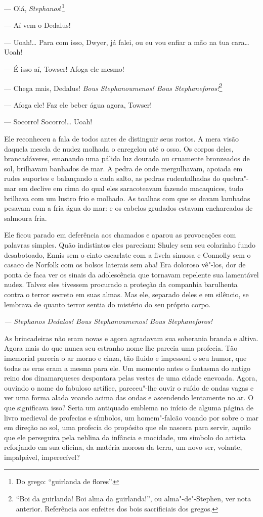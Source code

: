  --- Olá, \textit{Stephanos}!\footnote{ Do grego: ``guirlanda de flores''.}

 --- Aí vem o Dedalus!

 --- Uoah!\ldots{} Para com isso, Dwyer, já falei, ou eu vou enfiar a mão na
tua cara\ldots{} Uoah!

 --- É isso aí, Towser! Afoga ele mesmo!

 --- Chega mais, Dedalus! \textit{Bous Stephanoumenos! Bous
Stephaneforos!}\footnote{ ``Boi da guirlanda! Boi alma da guirlanda!'', ou
alma"-de"-Stephen, ver nota anterior. Referência aos enfeites dos bois
sacrificiais dos gregos.}

 --- Afoga ele! Faz ele beber água agora, Towser!

 --- Socorro! Socorro!\ldots{} Uoah!

Ele reconheceu a fala de todos antes de distinguir seus rostos. A mera
visão daquela mescla de nudez molhada o enregelou até o osso. Os corpos
deles, brancadáveres, emanando uma pálida luz dourada ou cruamente 
bronzeados de sol, brilhavam banhados de mar. A pedra de onde
mergulhavam, apoiada em rudes suportes e balançando a cada salto, as
pedras rudentalhadas do quebra"-mar em declive em cima do qual eles 
saracoteavam fazendo macaquices, tudo brilhava com um lustro frio e
molhado. As toalhas com que se davam lambadas pesavam com a fria água
do mar: e os cabelos grudados estavam encharcados de salmoura fria.

Ele ficou parado em deferência aos chamados e aparou as provocações com
palavras simples. Quão indistintos eles pareciam: Shuley sem seu
colarinho fundo desabotoado, Ennis sem o cinto escarlate com a fivela
sinuosa e Connolly sem o  casaco de Norfolk com os bolsos laterais sem
aba! Era doloroso vê"-los, dor de ponta de faca ver os sinais da
adolescência que tornavam repelente sua lamentável nudez. Talvez eles
tivessem procurado a proteção da companhia barulhenta contra o terror
secreto em suas almas. Mas ele, separado deles e em silêncio, se
lembrava de quanto terror sentia do mistério do seu próprio corpo.

{\itshape
 --- Stephanos Dedalos! Bous Stephanoumenos! Bous Stephaneforos!}

As brincadeiras não eram novas e agora agradavam sua soberania branda e
altiva. Agora mais do que nunca seu estranho nome lhe parecia uma
profecia. Tão imemorial parecia o ar morno e cinza, tão fluido e
impessoal o seu humor, que todas as eras eram a mesma para ele. Um
momento antes o fantasma do antigo reino dos dinamarqueses despontara
pelas vestes de uma cidade enevoada. Agora, ouvindo o nome do fabuloso
artífice, pareceu"-lhe ouvir o ruído de ondas vagas e ver uma forma
alada voando acima das ondas e ascendendo lentamente no ar. O que
significava isso? Seria um antiquado emblema no início de alguma página
de livro medieval de profecias e símbolos, um homem"-falcão voando por
sobre o mar em direção ao sol, uma profecia do propósito que ele
nascera para servir, aquilo que ele perseguira pela neblina da infância
e mocidade, um símbolo do artista reforjando em sua oficina, da matéria
morosa da terra, um novo ser, volante, impalpável, imperecível?

